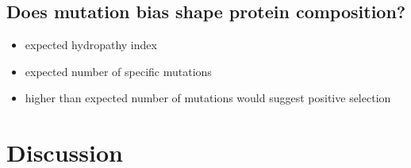 \documentclass[12pt,a4paper]{article}
\begin{document}
\subsection{Does mutation bias shape protein composition?}

\begin{itemize}
\item expected hydropathy index
\item expected number of specific mutations
\item higher than expected number of mutations would suggest positive selection
\end{itemize}

\section{Discussion} 
\end{document}

